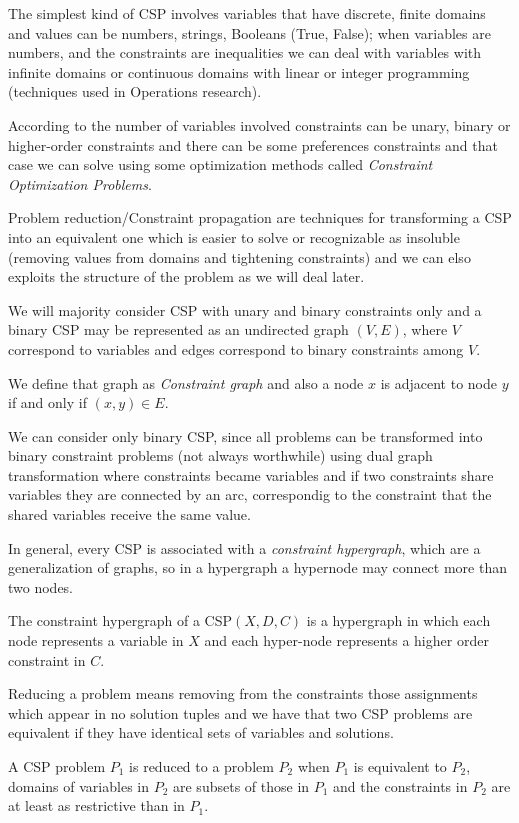 The simplest kind of CSP involves variables that have discrete,
finite domains and values can be numbers, strings, Booleans (True, False);
when variables are numbers, and the constraints are inequalities we can deal
with variables with infinite domains or continuous domains with linear
or integer programming (techniques used in Operations research).

According to the number of variables involved constraints can be unary,
binary or higher-order constraints and there can be some preferences constraints
and that case we can solve using some optimization methods called 
\emph{Constraint Optimization Problems}.

Problem reduction/Constraint propagation are techniques for transforming
a CSP into an equivalent one which is easier to solve or recognizable
as insoluble (removing values from domains and tightening constraints) and 
we can elso exploits the structure of the problem as we will deal later.

We will majority consider CSP with unary and binary constraints only and 
a binary CSP may be represented as an undirected graph $(V, E)$, where $V$
correspond to variables and edges correspond to binary constraints among $V$.

We define that graph as \emph{Constraint graph} and also a node $x$ is adjacent
to node $y$ if and only if $(x, y) \in E$.

We can consider only binary CSP, since all problems can be transformed into 
binary constraint problems (not always worthwhile) using dual graph 
transformation where constraints became variables and if two constraints share
variables they are connected by an arc, correspondig to the constraint that
the shared variables receive the same value.

In general, every CSP is associated with a \emph{constraint hypergraph},
which are a generalization of graphs, so in a hypergraph a hypernode may
connect more than two nodes.

The constraint hypergraph of a CSP$(X, D, C)$ is a hypergraph in which each
node represents a variable in $X$ and each hyper-node represents a 
higher order constraint in $C$.

Reducing a problem means removing from the constraints those assignments which
appear in no solution tuples and we have that two CSP problems are equivalent
if they have identical sets of variables and solutions.

A CSP problem $P_1$ is reduced to a problem $P_2$ when $P_1$ is equivalent to
$P_2$, domains of variables in $P_2$ are subsets of those in $P_1$ and the 
constraints in $P_2$ are at least as restrictive than in $P_1$.

